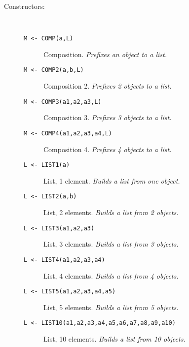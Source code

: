 \begin{description}
\item[Constructors:] \ \
  \begin{description}
  \item[{\tt M <- COMP(a,L) 
}]  Composition. {\em Prefixes an object to a list.}
  \item[{\tt M <- COMP2(a,b,L) 
}]  Composition 2. {\em Prefixes 2 objects to a list.}
  \item[{\tt M <- COMP3(a1,a2,a3,L) 
}]  Composition 3. {\em Prefixes 3 objects to a list.}
  \item[{\tt M <- COMP4(a1,a2,a3,a4,L) 
}]  Composition 4. {\em Prefixes 4 objects to a list.}
  \item[{\tt L <- LIST1(a) 
}]  List, 1 element. {\em Builds a list from one object.}
  \item[{\tt L <- LIST2(a,b) 
}]  List, 2 elements. {\em Builds a list from 2 objects.}
  \item[{\tt L <- LIST3(a1,a2,a3) 
}]  List, 3 elements. {\em Builds a list from 3 objects.}
  \item[{\tt L <- LIST4(a1,a2,a3,a4) 
}]  List, 4 elements. {\em Builds a list from 4 objects.}
  \item[{\tt L <- LIST5(a1,a2,a3,a4,a5) 
}]  List, 5 elements. {\em Builds a list from 5 objects.}
  \item[{\tt L <- LIST10(a1,a2,a3,a4,a5,a6,a7,a8,a9,a10) 
}]  List, 10 elements. {\em Builds a list from 10 objects.}
  \end{description}


\end{description}
